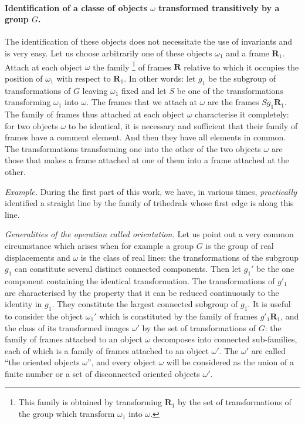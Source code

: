 \documentclass[leqno,11pt]{book}
\numberwithin{equation}{chapter}
\theoremstyle{shape1}
\theoremstyle{shapesmall}
\newcommand{\somespace}{\vspace{9pt}}
\begin{document}
\paragraph{Identification of a classe of objects $\omega$ transformed transitively by a group $G$.}
\label{sec:93}
The identification of these objects does not necessitate the use of invariants and is very easy. Let us choose arbitrarily one of these objects $\omega_{1}$ and a frame $\mathbf{R}_{1}$. Attach at each object $\omega$ the family \footnote{This family is obtained by transforming $\mathbf{R}_{1}$ by the set of transformations of the group which transform $\omega_{1}$ into $\omega$.} of frames $\mathbf{R}$ relative to which it occupies the position of $\omega_{1}$ with respect to $\mathbf{R}_{1}$. In other words: let $g_{1}$ be the subgroup of transformations of $G$ leaving $\omega_{1}$ fixed and let $S$ be one of the transformations transforming $\omega_{1}$ into $\omega$. The frames that we attach at $\omega$ are the frames $Sg_{1}\mathbf{R}_{1}$. The family of frames thus attached at each object $\omega$ characterise it completely: for two objects $\omega$ to be identical, it is necessary and sufficient that their family of frames have a comment element. And then they have all elements in common. The transformations transforming one into the other of the two objects $\omega$ are those that makes a frame attached at one of them into a frame attached at the other.

\somespace

{\small
\emph{Example.} During the first part of this work, we have, in various times, \emph{practically} identified a straight line by the family of trihedrals whose first edge is along this line.
}

\somespace

\emph{Generalities of the operation called orientation.} Let us point out a very common circumstance which arises when for example a group $G$ is the group of real displacements and $\omega$ is the class of real lines: the transformations of the subgroup $g_{1}$ can constitute several distinct connected components. Then let $g_{1}'$ be the one component containing the identical transformation. The transformations of $g'_{1}$ are characterised by the property that it can be reduced continuously to the identity in $g_{1}$. They constitute the largest connected subgroup of $g_{1}$. It is useful to consider the object $\omega_{1}'$ which is constituted by the family of frames $g'_{1}\mathbf{R}_{1}$, and the class of its transformed images $\omega'$ by the set of transformations of $G$: the family of frames attached to an object $\omega$ decomposes into connected sub-families, each of which is a family of frames attached to an object $\omega'$. The $\omega'$ are called ``the oriented objects $\omega$'', and every object $\omega$ will be considered as the union of a finite number or a set of disconnected oriented objects $\omega'$.
\end{document}
